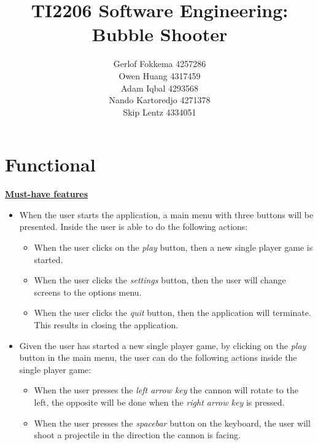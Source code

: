 \documentclass[a4paper,11pt]{article}
\title{TI2206 Software Engineering: Bubble Shooter}
\author{Gerlof Fokkema 4257286 \\
	Owen Huang 4317459 \\
	Adam Iqbal 4293568 \\
	Nando Kartoredjo 4271378 \\
	Skip Lentz 4334051 \\
}
\begin{document}
\maketitle

\newpage
\section*{Functional}
\textbf{\underline{Must-have features}}
\begin{itemize}
  \item When the user starts the application, a main menu with three buttons will be presented. Inside the user is able to do the following actions:
  \begin{itemize}
    \item When the user clicks on the \textit{play} button, then a new single player game is started.
    \item When the user clicks the \textit{settings} button, then the user will change screens to the options menu.
    \item When the user clicks the \textit{quit} button, then the application will terminate. This results in closing the application.
  \end{itemize}
  \item Given the user has started a new single player game, by clicking on the \textit{play} button in the main menu, the user can do the following actions inside the single player game:
  \begin{itemize}
    \item When the user presses the \textit{left arrow key} the cannon will rotate to the left, the opposite will be done when the \textit{right arrow key} is pressed.
    \item When the user presses the \textit{spacebar} button on the keyboard, the user will shoot a projectile in the direction the cannon is facing. \\
  \end{itemize}
\end{itemize}
\end{document}
